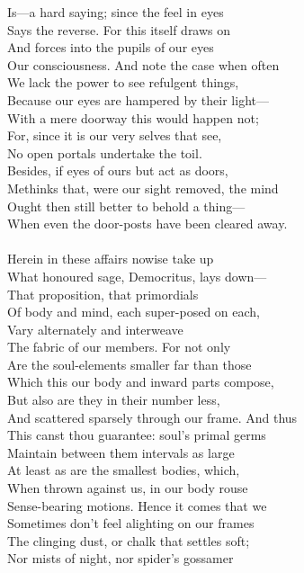 Is—a hard saying; since the feel in eyes\\
Says the reverse. For this itself draws on\\
And forces into the pupils of our eyes\\
Our consciousness. And note the case when often\\
We lack the power to see refulgent things,\\
Because our eyes are hampered by their light—\\
With a mere doorway this would happen not;\\
For, since it is our very selves that see,\\
No open portals undertake the toil.\\
Besides, if eyes of ours but act as doors,\\
Methinks that, were our sight removed, the mind\\
Ought then still better to behold a thing—\\
When even the door-posts have been cleared away.\\
\\
Herein in these affairs nowise take up\\
What honoured sage, Democritus, lays down—\\
That proposition, that primordials\\
Of body and mind, each super-posed on each,\\
Vary alternately and interweave\\
The fabric of our members. For not only\\
Are the soul-elements smaller far than those\\
Which this our body and inward parts compose,\\
But also are they in their number less,\\
And scattered sparsely through our frame. And thus\\
This canst thou guarantee: soul's primal germs\\
Maintain between them intervals as large\\
At least as are the smallest bodies, which,\\
When thrown against us, in our body rouse\\
Sense-bearing motions. Hence it comes that we\\
Sometimes don't feel alighting on our frames\\
The clinging dust, or chalk that settles soft;\\
Nor mists of night, nor spider's gossamer\\
